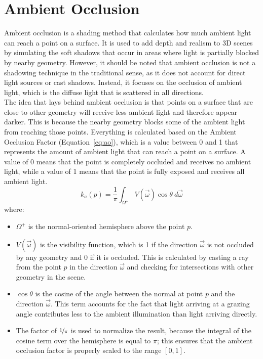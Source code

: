\chapter{Ambient Occlusion}

Ambient occlusion is a shading method that calculates how much ambient light can reach a point on a surface. It is used to add depth and realism to 3D scenes by simulating the soft shadows that occur in areas where light is partially blocked by nearby geometry. However, it should be noted that ambient occlusion is not a shadowing technique in the traditional sense, as it does not account for direct light sources or cast shadows. Instead, it focuses on the occlusion of ambient light, which is the diffuse light that is scattered in all directions.\\

The idea that lays behind ambient occlusion is that points on a surface that are close to other geometry will receive less ambient light and therefore appear darker. This is because the nearby geometry blocks some of the ambient light from reaching those points. Everything is calculated based on the Ambient Occlusion Factor (Equation~\ref{eq:ao}), which is a value between 0 and 1 that represents the amount of ambient light that can reach a point on a surface. A value of 0 means that the point is completely occluded and receives no ambient light, while a value of 1 means that the point is fully exposed and receives all ambient light.
\begin{equation}
    k_a(p) = \frac{1}{\pi} \int_{\Omega^+} V\left(\vec{\omega}\right) \cos \theta\ d\vec{\omega}
    \label{eq:ao}
\end{equation}
where:
\begin{itemize}
    \item $\Omega^+$ is the normal-oriented hemisphere above the point $p$.
    \item $V\left(\vec{\omega}\right)$ is the visibility function, which is 1 if the direction $\vec{\omega}$ is not occluded by any geometry and 0 if it is occluded. This is calculated by casting a ray from the point $p$ in the direction $\vec{\omega}$ and checking for intersections with other geometry in the scene.
    \item $\cos \theta$ is the cosine of the angle between the normal at point $p$ and the direction $\vec{\omega}$. This term accounts for the fact that light arriving at a grazing angle contributes less to the ambient illumination than light arriving directly.
    \item The factor of $\nicefrac{1}{\pi}$ is used to normalize the result, because the integral of the cosine term over the hemisphere is equal to $\pi$; this ensures that the ambient occlusion factor is properly scaled to the range $[0, 1]$.
\end{itemize}

